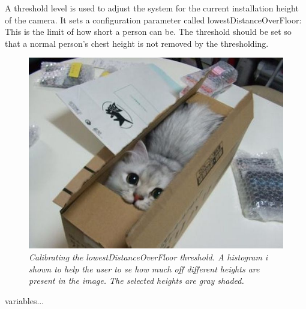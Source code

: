 A threshold level is used to adjust the system for the current installation height of the camera. It sets a configuration parameter called lowestDistanceOverFloor: This is the limit of how short a person can be. The threshold should be set so that a normal person’s chest height is not removed by the thresholding.

\begin{figure}[htb]
	\centering
	\includegraphics[width=\linewidth]{images/boxcat.jpg}
	\caption[Overview of the entire system]{\textit{Calibrating the lowestDistanceOverFloor threshold. A histogram i shown to help the user to se how much off different heights are present in the image. The selected heights are gray shaded.}}
	\label{fig:lowestDistanceOverFloor_calibration}  %
\end{figure}

variables... 